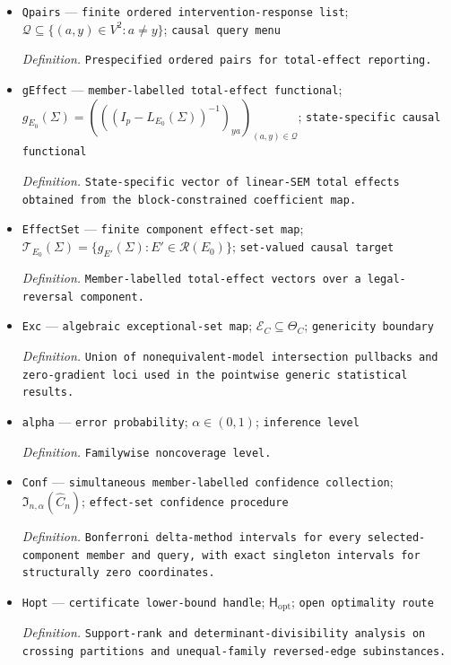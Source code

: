 \documentclass{article}
\begin{document}
\begin{itemize}
  \item \texttt{Qpairs} --- \texttt{finite ordered intervention-\allowbreak{}response list}; \(\mathcal Q\subseteq\{(a,y)\in V^2:a\neq y\}\); \texttt{causal query menu}
  \par\smallskip\noindent\emph{Definition.} \texttt{Prespecified ordered pairs for total-\allowbreak{}effect reporting.}
  \item \texttt{gEffect} --- \texttt{member-\allowbreak{}labelled total-\allowbreak{}effect functional}; \(g_{E_0}(\Sigma)=(((I_p-L_{E_0}(\Sigma))^{-1})_{ya})_{(a,y)\in\mathcal Q}\); \texttt{state-\allowbreak{}specific causal functional}
  \par\smallskip\noindent\emph{Definition.} \texttt{State-\allowbreak{}specific vector of linear-\allowbreak{}SEM total effects obtained from the block-\allowbreak{}constrained coefficient map.}
  \item \texttt{EffectSet} --- \texttt{finite component effect-\allowbreak{}set map}; \(\mathcal T_{E_0}(\Sigma)=\{g_{E'}(\Sigma):E'\in\mathcal R(E_0)\}\); \texttt{set-\allowbreak{}valued causal target}
  \par\smallskip\noindent\emph{Definition.} \texttt{Member-\allowbreak{}labelled total-\allowbreak{}effect vectors over a legal-\allowbreak{}reversal component.}
  \item \texttt{Exc} --- \texttt{algebraic exceptional-\allowbreak{}set map}; \(\mathcal E_C\subseteq\Theta_C\); \texttt{genericity boundary}
  \par\smallskip\noindent\emph{Definition.} \texttt{Union of nonequivalent-\allowbreak{}model intersection pullbacks and zero-\allowbreak{}gradient loci used in the pointwise generic statistical results.}
  \item \texttt{alpha} --- \texttt{error probability}; \(\alpha\in(0,1)\); \texttt{inference level}
  \par\smallskip\noindent\emph{Definition.} \texttt{Familywise noncoverage level.}
  \item \texttt{Conf} --- \texttt{simultaneous member-\allowbreak{}labelled confidence collection}; \(\mathfrak I_{n,\alpha}(\widehat C_n)\); \texttt{effect-\allowbreak{}set confidence procedure}
  \par\smallskip\noindent\emph{Definition.} \texttt{Bonferroni delta-\allowbreak{}method intervals for every selected-\allowbreak{}component member and query,\allowbreak{} with exact singleton intervals for structurally zero coordinates.}
  \item \texttt{Hopt} --- \texttt{certificate lower-\allowbreak{}bound handle}; \(\mathsf H_{\mathrm{opt}}\); \texttt{open optimality route}
  \par\smallskip\noindent\emph{Definition.} \texttt{Support-\allowbreak{}rank and determinant-\allowbreak{}divisibility analysis on crossing partitions and unequal-\allowbreak{}family reversed-\allowbreak{}edge subinstances.}
\end{itemize}
\end{document}
